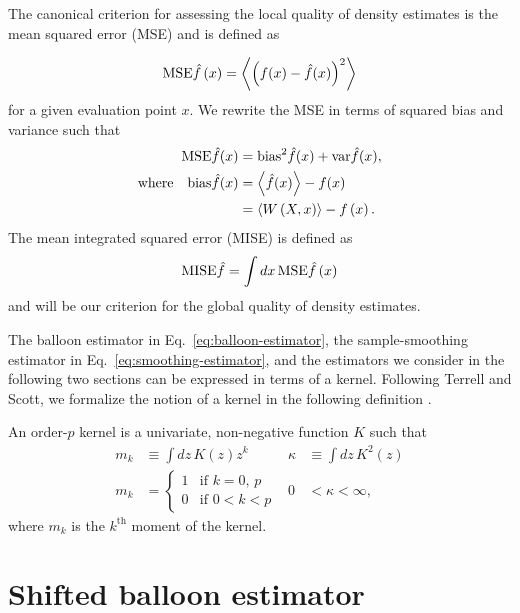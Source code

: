 The canonical criterion for assessing the local quality of density estimates is the mean squared error (MSE) and is defined as

\[
\mathrm{MSE}\hat{f}\left(x\right)=\left\langle \left(f(x)-\hat{f}(x)\right)^{2}\right\rangle 
\]
for a given evaluation point $x$. We rewrite the MSE in terms of squared bias and variance such that 
\begin{align}
\mathrm{MSE}\hat{f}(x) & =\mathrm{bias}^{2}\hat{f}(x)+\mathrm{var}\hat{f}(x),\nonumber \\
\text{where}\quad\mathrm{bias}\hat{f}(x) & =\left\langle \hat{f}(x)\right\rangle -f(x)\label{eq:generalised-bias}\\
 & =\left\langle W\left(X,x\right)\right\rangle -f\left(x\right).\nonumber 
\end{align}
The mean integrated squared error (MISE) is defined as
\[
\mathrm{MISE}\hat{f}=\int dx\,\mathrm{MSE}\hat{f}\left(x\right)
\]
and will be our criterion for the global quality of density estimates.

The balloon estimator in Eq.~\eqref{eq:balloon-estimator}, the sample-smoothing estimator in Eq.~\eqref{eq:smoothing-estimator}, and the estimators we consider in the following two sections can be expressed in terms of a kernel. Following Terrell and Scott, we formalize the notion of a kernel in the following definition \cite{Terrell1992}.
\begin{defn}
\label{def:order-p-kernel}An order-$p$ kernel is a univariate, non-negative function $K$ such that 
\begin{equation}
\begin{aligned}m_{k} & \equiv\int dz\,K(z)z^{k} & \kappa & \equiv\int dz\,K^{2}(z)\\
m_{k} & =\begin{cases}
1 & \text{if }k=0,\,p\\
0 & \text{if }0<k<p
\end{cases} & 0 & <\kappa<\infty,
\end{aligned}
\label{eq:kernel-properties}
\end{equation}
where $m_{k}$ is the $k^{\mathrm{th}}$ moment of the kernel.
\end{defn}

\section{Shifted balloon estimator\label{sec:balloon}}

